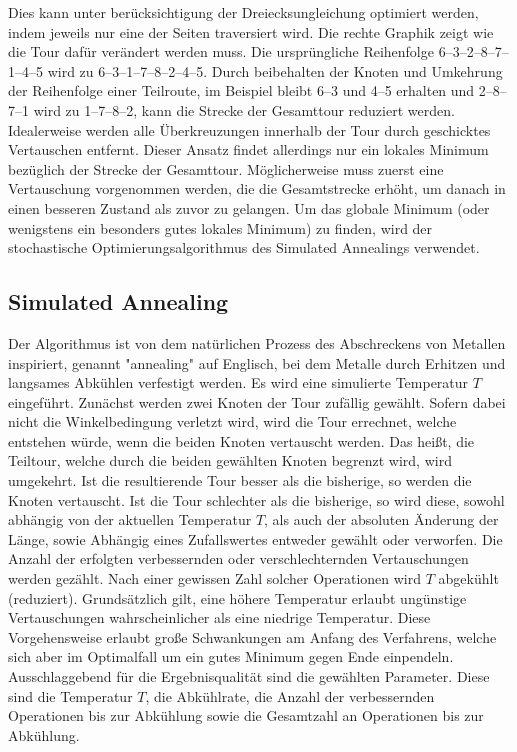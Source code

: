 Dies kann unter berücksichtigung der Dreiecksungleichung optimiert werden, indem jeweils nur eine der Seiten traversiert wird.
Die rechte Graphik zeigt wie die Tour dafür verändert werden muss.
Die ursprüngliche Reihenfolge 6--3--2--8--7--1--4--5 wird zu 6--3--1--7--8--2--4--5.
Durch beibehalten der Knoten und Umkehrung der Reihenfolge einer Teilroute,
im Beispiel bleibt 6--3 und 4--5 erhalten und 2--8--7--1 wird zu 1--7--8--2, kann die Strecke der Gesamttour reduziert werden. \\
Idealerweise werden alle Überkreuzungen innerhalb der Tour durch geschicktes Vertauschen entfernt.
Dieser Ansatz findet allerdings nur ein lokales Minimum bezüglich der Strecke der Gesamttour.
Möglicherweise muss zuerst eine Vertauschung vorgenommen werden, die die Gesamtstrecke erhöht, um
danach in einen besseren Zustand als zuvor zu gelangen.
Um das globale Minimum (oder wenigstens ein besonders gutes lokales Minimum) zu finden, wird der stochastische
Optimierungsalgorithmus des Simulated Annealings verwendet.

\subsection{Simulated Annealing}\label{subsec:simulated-annealing}
Der Algorithmus ist von dem natürlichen Prozess des Abschreckens von Metallen inspiriert, genannt "annealing" auf
Englisch, bei dem Metalle durch Erhitzen und langsames Abkühlen verfestigt werden.
Es wird eine simulierte Temperatur $T$ eingeführt.
Zunächst werden zwei Knoten der Tour zufällig gewählt.
Sofern dabei nicht die Winkelbedingung verletzt wird, wird die Tour errechnet, welche entstehen würde,
wenn die beiden Knoten vertauscht werden.
Das heißt, die Teiltour, welche durch die beiden gewählten Knoten begrenzt wird, wird umgekehrt.
Ist die resultierende Tour besser als die bisherige, so werden die Knoten vertauscht.
Ist die Tour schlechter als die bisherige, so wird diese, sowohl abhängig von der
aktuellen Temperatur $T$, als auch der absoluten Änderung der Länge, sowie Abhängig eines
Zufallswertes entweder gewählt oder verworfen.
Die Anzahl der erfolgten verbessernden oder verschlechternden Vertauschungen werden gezählt.
Nach einer gewissen Zahl solcher Operationen wird $T$ abgekühlt (reduziert).
Grundsätzlich gilt, eine höhere Temperatur erlaubt ungünstige Vertauschungen wahrscheinlicher als eine niedrige Temperatur.
Diese Vorgehensweise erlaubt große Schwankungen am Anfang des Verfahrens, welche sich aber im Optimalfall um ein gutes
Minimum gegen Ende einpendeln.
Ausschlaggebend für die Ergebnisqualität sind die gewählten Parameter.
Diese sind die Temperatur $T$, die Abkühlrate, die Anzahl der verbessernden Operationen bis zur Abkühlung sowie die Gesamtzahl
an Operationen bis zur Abkühlung.


